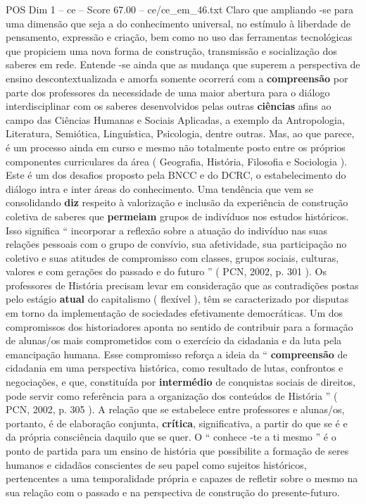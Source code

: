 \begin{textsample}{POS Dim 1 – ce – Score 67.00 – ce/ce\_em\_46.txt}
Claro que ampliando -se para uma dimensão que seja a do conhecimento universal, no estímulo à liberdade de pensamento, expressão e criação, bem como no uso das ferramentas tecnológicas que propiciem uma nova forma de construção, transmissão e socialização dos saberes em rede.
Entende -se ainda que as mudança que superem a perspectiva de ensino descontextualizada e amorfa somente ocorrerá com a \textbf{compreensão} por parte dos professores da necessidade de uma maior abertura para o diálogo interdisciplinar com os saberes desenvolvidos pelas outras \textbf{ciências} afins ao campo das Ciências Humanas e Sociais Aplicadas, a exemplo da Antropologia, Literatura, Semiótica, Linguística, Psicologia, dentre outras.
Mas, ao que parece, é um processo ainda em curso e mesmo não totalmente posto entre os próprios componentes curriculares da área ( Geografia, História, Filosofia e Sociologia ).
Este é um dos desafios proposto pela BNCC e do DCRC, o estabelecimento do diálogo intra e inter áreas do conhecimento.
Uma tendência que vem se consolidando \textbf{diz} respeito à valorização e inclusão da experiência de construção coletiva de saberes que \textbf{permeiam} grupos de indivíduos nos estudos históricos.
Isso significa “ incorporar a reflexão sobre a atuação do indivíduo nas suas relações pessoais com o grupo de convívio, sua afetividade, sua participação no coletivo e suas atitudes de compromisso com classes, grupos sociais, culturas, valores e com gerações do passado e do futuro ” ( PCN, 2002, p. 301 ).
Os professores de História precisam levar em consideração que as contradições postas pelo estágio \textbf{atual} do capitalismo ( flexível ), têm se caracterizado por disputas em torno da implementação de sociedades efetivamente democráticas.
Um dos compromissos dos historiadores aponta no sentido de contribuir para a formação de alunas/os mais comprometidos com o exercício da cidadania e da luta pela emancipação humana.
Esse compromisso reforça a ideia da “ \textbf{compreensão} de cidadania em uma perspectiva histórica, como resultado de lutas, confrontos e negociações, e que, constituída por \textbf{intermédio} de conquistas sociais de direitos, pode servir como referência para a organização dos conteúdos de História ” ( PCN, 2002, p. 305 ).
A relação que se estabelece entre professores e alunas/os, portanto, é de elaboração conjunta, \textbf{crítica}, significativa, a partir do que se é e da própria consciência daquilo que se quer.
O “ conhece -te a ti mesmo ” é o ponto de partida para um ensino de história que possibilite a formação de seres humanos e cidadãos conscientes de seu papel como sujeitos históricos, pertencentes a uma temporalidade própria e capazes de refletir sobre o mesmo na sua relação com o passado e na perspectiva de construção do presente-futuro.

\end{textsample}
